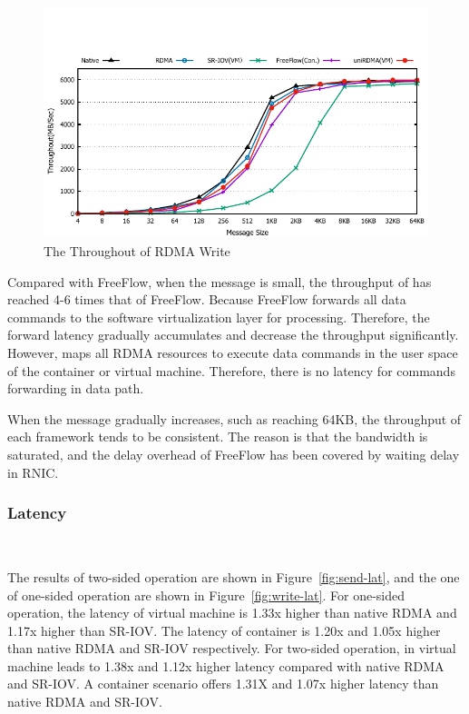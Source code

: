 \begin{figure}[!ht]
	\centering
	\includegraphics[width=1.0\linewidth]{images/write-bw.pdf}
	\caption{The Throughout of RDMA Write}
	\label{fig:write-bw}
\end{figure}

Compared with FreeFlow, when the message is small, the throughput of \sys has reached 4-6 times that of FreeFlow. Because FreeFlow forwards all data commands to the software virtualization layer for processing. Therefore, the forward latency gradually accumulates and decrease the throughput significantly. However, \sys maps all RDMA resources to execute data commands in the user space of the container or virtual machine. Therefore, there is no latency for commands forwarding in data path.



When the message gradually increases, such as reaching 64KB, the throughput of each framework tends to be consistent. The reason is that the bandwidth is saturated, and the delay overhead of FreeFlow has been covered by waiting delay in RNIC.

\subsubsection{Latency}
\
\noindent

The results of two-sided operation are shown in Figure~\ref{fig:send-lat}, and the one of one-sided operation are shown in Figure~\ref{fig:write-lat}. For one-sided operation, the latency of virtual machine is 1.33x higher than native RDMA and 1.17x higher than SR-IOV. The latency of container is 1.20x and 1.05x higher than native RDMA and SR-IOV respectively. For two-sided operation, \sys in virtual machine leads to 1.38x and 1.12x higher latency compared with native RDMA and SR-IOV. A container scenario offers 1.31X and 1.07x higher latency than native RDMA and SR-IOV. 

